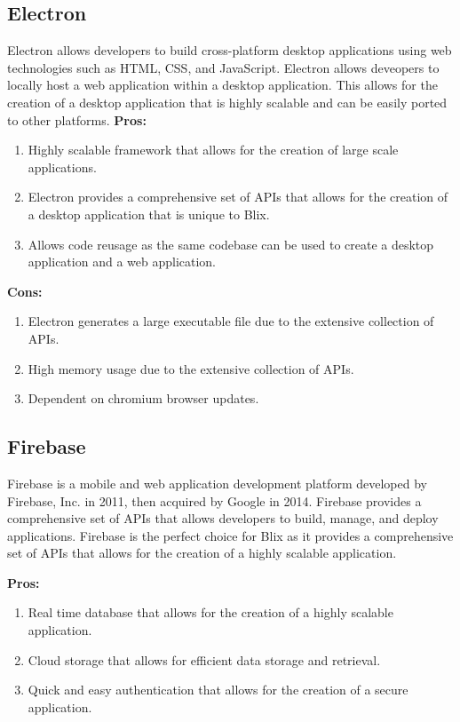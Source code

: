 \documentclass[11pt,a4paper]{article}
\begin{document}
\subsection{Electron}

Electron allows developers to build cross-platform desktop applications using web technologies such as HTML, CSS, and JavaScript.
Electron allows deveopers to locally host a web application within a desktop application. 
This allows for the creation of a desktop application that is highly scalable and can be easily ported to other platforms.
\textbf{Pros:}

\begin{enumerate}[label*=\arabic*.]
	\item[\textbullet] Highly scalable framework that allows for the creation of large scale applications.
	\item[\textbullet] Electron provides a comprehensive set of APIs that allows for the creation of a desktop application that is unique to Blix.
	\item[\textbullet] Allows code reusage as the same codebase can be used to create a desktop application and a web application.
\end{enumerate}

\textbf{Cons:}

\begin{enumerate}[label*=\arabic*.]
	\item[\textbullet] Electron generates a large executable file due to the extensive collection of APIs.
	\item[\textbullet] High memory usage due to the extensive collection of APIs.
	\item[\textbullet] Dependent on chromium browser updates.
\end{enumerate}


\subsection{Firebase}

Firebase is a mobile and web application development platform developed by Firebase, Inc. in 2011, then acquired by Google in 2014.
Firebase provides a comprehensive set of APIs that allows developers to build, manage, and deploy applications.
Firebase is the perfect choice for Blix as it provides a comprehensive set of APIs that allows for the creation of a highly scalable application.

\textbf{Pros:}
\begin{enumerate}[label*=\arabic*.]
	\item[\textbullet] Real time database that allows for the creation of a highly scalable application.
	\item[\textbullet] Cloud storage that allows for efficient data storage and retrieval.
	\item[\textbullet] Quick and easy authentication that allows for the creation of a secure application.
\end{enumerate}
\end{document}
